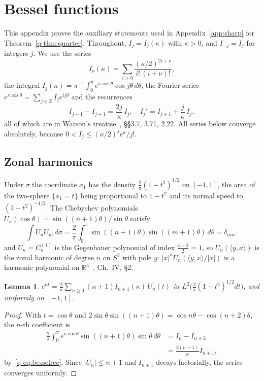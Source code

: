 \documentclass[11pt]{amsart}
\newtheorem{lemma}[theorem]{Lemma}
\theoremstyle{definition}
\theoremstyle{remark}
\numberwithin{equation}{section}
\newcommand{\R}{\mathbb{R}}
\newcommand{\Z}{\mathbb{Z}}
\newcommand{\ip}[2]{\langle #1,#2\rangle}
\begin{document}
\section{Bessel functions}\label{app:bessel}

This appendix proves the auxiliary statements used in Appendix~\ref{app:sharp}
for Theorem~\ref{q-thm:quarter}. Throughout, $I_j=I_j(\kappa)$ with $\kappa>0$,
and $I_{-j}=I_j$ for integers $j$. We use the series
\[
I_\nu(\kappa)=\sum_{i\ge0}\frac{(\kappa/2)^{2i+\nu}}{i!\,(i+\nu)!},
\]
the integral $I_j(\kappa)=\pi^{-1}\int_0^\pi e^{\kappa\cos\theta}\cos
j\theta\,d\theta$, the Fourier series $e^{\kappa\cos\theta}=\sum_{j\in\Z}
I_je^{ij\theta}$ and the recurrences
\begin{equation}\label{q-eq:besselrec}
I_{j-1}-I_{j+1}=\frac{2j}\kappa\,I_j,\quad I_j'=I_{j+1}+\frac j\kappa\,I_j ,
\end{equation}
all of which are in Watson's treatise~\cite{Wat44}, \S\S3.7, 3.71,
2.22. All series below converge absolutely, because $0<I_j\le(\kappa/2)^j
e^\kappa/j!$.

\subsection{Zonal harmonics}

Under $\sigma$ the coordinate $x_1$ has the density $\frac2\pi(1-t^2)^{1/2}$
on $[-1,1]$, the area of the two-sphere $\{x_1=t\}$ being proportional to
$1-t^2$ and its normal speed to $(1-t^2)^{-1/2}$. The Chebyshev polynomials
$U_n(\cos\theta)=\sin((n+1)\theta)/\sin\theta$ satisfy
\[
\int U_nU_m\,d\sigma=\frac2\pi\int_0^\pi\sin((n+1)\theta)\sin((m+1)\theta)
\,d\theta=\delta_{nm},
\]
and $U_n=C_n^{(1)}$ is the Gegenbauer polynomial of index $\frac{4-2}2=1$, so
$U_n(\ip yx)$ is the zonal harmonic of degree $n$ on $S^3$ with pole $y$:
$|x|^nU_n(\ip yx/|x|)$ is a harmonic polynomial on $\R^4$~\cite{SW71},
Ch.~IV, \S2.

\begin{lemma}\label{q-lem:chebexp}
$e^{\kappa t}=\frac2\kappa\sum_{n\ge0}(n+1)I_{n+1}(\kappa)\,U_n(t)$ in
$L^2\bigl(\frac2\pi(1-t^2)^{1/2}dt\bigr)$, and uniformly on $[-1,1]$.
\end{lemma}

\begin{proof}
With $t=\cos\theta$ and $2\sin\theta\sin((n+1)\theta)=\cos n\theta-\cos(
n+2)\theta$, the $n$-th coefficient is
\[
\begin{aligned}
\frac2\pi\int_0^\pi e^{\kappa\cos\theta}\sin((n+1)\theta)\sin\theta\,d\theta
&=I_n-I_{n+2}\\
&=\frac{2(n+1)}\kappa I_{n+1},
\end{aligned}
\]
by~\eqref{q-eq:besselrec}. Since $|U_n|\le n+1$ and $I_{n+1}$ decays
factorially, the series converges uniformly.
\end{proof}
\end{document}
